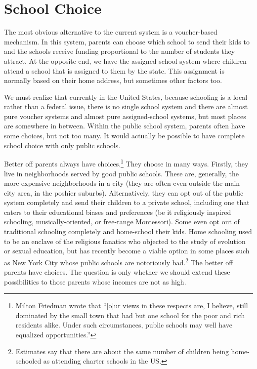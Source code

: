 \section{School Choice}

The most obvious alternative to the current system is a voucher-based
mechanism. In this system, parents can choose which school to send their kids
to and the schools receive funding proportional to the number of students they
attract. At the opposite end, we have the assigned-school system where children
attend a school that is assigned to them by the state. This assignment is
normally based on their home address, but sometimes other factors too.

We must realize that currently in the United States, because schooling is a
local rather than a federal issue, there is no single school system and there
are almost pure voucher systems and almost pure assigned-school systems, but
most places are somewhere in between. Within the public school system, parents
often have some choices, but not too many. It would actually be possible to
have complete school choice with only public schools.

Better off parents always have choices.\footnote{Milton Friedman wrote that
``[o]ur views in these respects are, I believe, still dominated by the small
town that had but one school for the poor and rich residents alike. Under such
circumstances, public schools may well have equalized
opportunities.''} They choose in many
ways. Firstly, they live in neighborhoods served by good public schools. These
are, generally, the more expensive neighborhoods in a city (they are often even
outside the main city area, in the poshier suburbs). Alternatively, they can
opt out of the public system completely and send their children to a private
school, including one that caters to their educational biases and
preferences (be it religiously inspired schooling, musically-oriented, or
free-range Montessori). Some even opt out of traditional schooling completely
and home-school their kids. Home schooling used to be an enclave of the
religious fanatics who objected to the study of evolution or sexual education,
but has recently become a viable option in some places such as New York City
whose public schools are notoriously bad.\footnote{Estimates
say that there are about the same number of children being home-schooled as
attending charter schools in the US.}
The better off parents have choices. The question is only whether we should
extend these possibilities to those parents whose incomes are not as high.


